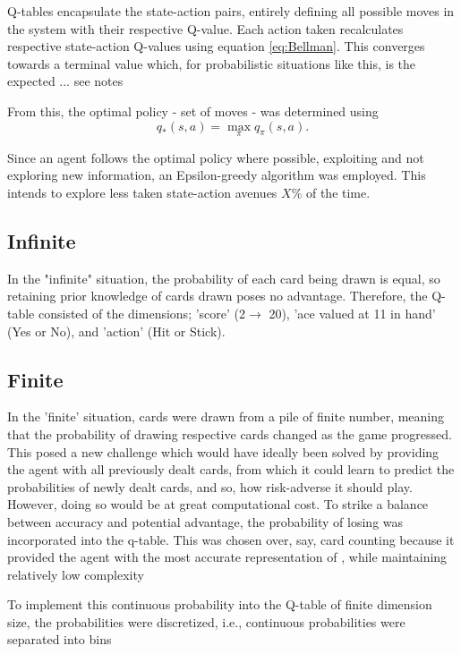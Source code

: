 \smallskip
Q-tables encapsulate the state-action pairs, entirely defining all possible moves in the system with their respective Q-value. Each action taken recalculates respective state-action Q-values using equation \ref{eq:Bellman}. This converges towards a terminal value which, for probabilistic situations like this, is the expected ... see notes

From this, the optimal policy - set of moves - was determined using
\begin{equation} \label{eq:optimal policy}
    q_*(s,a) = \max_{\pi}q_{\pi}(s,a)\text{.}
\end{equation}

\smallskip
Since an agent follows the optimal policy where possible, exploiting  and not exploring new information, an Epsilon-greedy algorithm was employed. This intends to explore less taken state-action avenues \(X\%\) of the time. 

\subsection{Infinite}

In the "infinite" situation, the probability of each card being drawn is equal, so retaining prior knowledge of cards drawn poses no advantage. Therefore, the Q-table consisted of the dimensions; 'score' (2$\rightarrow $ 20), 'ace valued at 11 in hand' (Yes or No), and 'action' (Hit or Stick).


\subsection{Finite}

In the 'finite' situation, cards were drawn from a pile of finite number, meaning that the probability of drawing respective cards changed as the game progressed. This posed a new challenge which would have ideally been solved by providing the agent with all previously dealt cards, from which it could learn to predict the probabilities of newly dealt cards, and so, how risk-adverse it should play. However, doing so would be at great computational cost. To strike a balance between accuracy and potential advantage, the probability of losing was incorporated into the q-table. This was chosen over, say, card counting because it provided the agent with the most accurate representation of , while maintaining relatively low complexity

To implement this continuous probability into the Q-table of finite dimension size, the probabilities were discretized, i.e., continuous probabilities were separated into bins 


